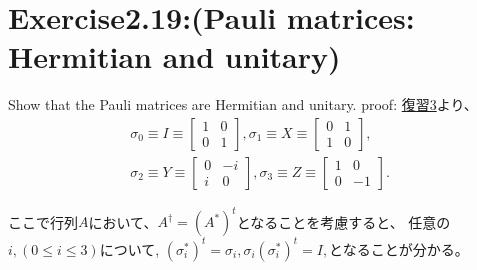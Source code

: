 \section{\large Exercise2.19:(Pauli matrices: Hermitian and unitary)}
Show that the Pauli matrices are Hermitian and unitary.
\newline
{\large proof:}
\hyperlink{hukushuu3}{復習3}より、
\begin{eqnarray*}
\sigma_0 \equiv I \equiv 
\left[ \begin{array}{cc}
	1 & 0 \\
	0 & 1 
	\end{array}
\right],
\sigma_1 \equiv X \equiv 
\left[ \begin{array}{cc}
	0 & 1 \\
	1 & 0 
	\end{array}
\right],\\
\sigma_2 \equiv Y \equiv 
\left[ \begin{array}{cc}
	0 & -i \\
	i & 0 
	\end{array}
\right],
\sigma_3 \equiv Z \equiv 
\left[ \begin{array}{cc}
	1 & 0 \\
	0 & -1 
	\end{array}
\right].
\end{eqnarray*}

ここで行列$A$において、$A^\dagger = (A^*)^t$となることを考慮すると、
任意の$i, (0\leq i\leq 3)$について,
$(\sigma_{i}^*)^t = \sigma_{i},
\sigma_{i} (\sigma_{i}^*)^t = I,$となることが分かる。
